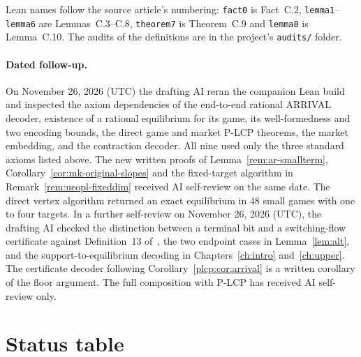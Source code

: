 Lean names follow the source article's numbering: \texttt{fact0} is Fact~C.2, \texttt{lemma1}--\texttt{lemma6} are Lemmas~C.3--C.8, \texttt{theorem7} is Theorem~C.9 and \texttt{lemma8} is Lemma~C.10. The audits of the definitions are in the project's \texttt{audits/} folder.

\paragraph{Dated follow-up.}
On November 26, 2026 (UTC) the drafting AI reran the companion Lean
build and inspected the axiom dependencies of the end-to-end rational
ARRIVAL decoder, existence of a rational equilibrium for its game, its
well-formedness and two encoding bounds, the direct game and market
P-LCP theorems, the market embedding, and the contraction decoder.
All nine used only the three standard axioms listed above. The new
written proofs of Lemma~\ref{rem:ar-smallterm}, Corollary~\ref{cor:mk-original-slopes}
and the fixed-target algorithm in Remark~\ref{rem:ueopl-fixeddim}
received AI self-review on the same date. The direct vertex algorithm
returned an exact equilibrium in 48 small games with one to four targets.
In a further self-review on November 26, 2026 (UTC), the drafting AI
checked the distinction between a terminal bit and a switching-flow
certificate against Definition~13 of~\cite{ghhkms18}, the two endpoint
cases in Lemma~\ref{lem:alt}, and the support-to-equilibrium decoding
in Chapters~\ref{ch:intro} and~\ref{ch:upper}. The certificate decoder
following Corollary~\ref{plcp:cor:arrival} is a written corollary of
the floor argument. The full composition with P-LCP has received AI
self-review only.

\section{Status table}

